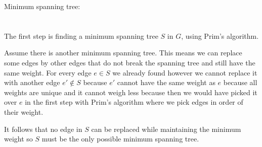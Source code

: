 \documentclass[12pt, a4paper]{article}
\begin{document}
Minimum spanning tree:

\section{} %

\section{} %

\section{} %

The first step is finding a minimum spanning tree $S$ in $G$, using Prim's algorithm.

Assume there is another minimum spanning tree. This means we can replace some edges by other edges that do not break the spanning tree and still have the same weight. For every edge $e \in S$ we already found however we cannot replace it with another edge $e' \not\in S$ because $e'$ cannot have the same weight as $e$ because all weights are unique and it cannot weigh less because then we would have picked it over $e$ in the first step with Prim's algorithm where we pick edges in order of their weight.

It follows that no edge in $S$ can be replaced while maintaining the minimum weight so $S$ must be the only possible minimum spanning tree.
\end{document}

